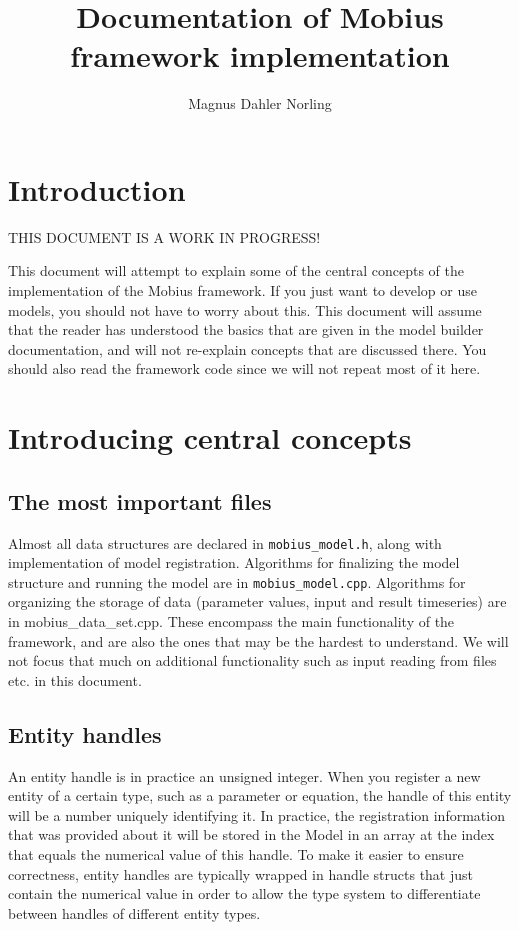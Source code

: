 \documentclass[11pt]{article}
\title{Documentation of Mobius framework implementation}
\author{Magnus Dahler Norling}
\theoremstyle{definition}
\begin{document}
\maketitle

\section{Introduction}
THIS DOCUMENT IS A WORK IN PROGRESS!

This document will attempt to explain some of the central concepts of the implementation of the Mobius framework. If you just want to develop or use models, you should not have to worry about this. This document will assume that the reader has understood the basics that are given in the model builder documentation, and will not re-explain concepts that are discussed there. You should also read the framework code since we will not repeat most of it here.

\section{Introducing central concepts}

\subsection{The most important files}

Almost all data structures are declared in {\tt mobius\_model.h}, along with implementation of model registration. Algorithms for finalizing the model structure and running the model are in {\tt mobius\_model.cpp}. Algorithms for organizing the storage of data (parameter values, input and result timeseries) are in {mobius\_data\_set.cpp}. These encompass the main functionality of the framework, and are also the ones that may be the hardest to understand. We will not focus that much on additional functionality such as input reading from files etc. in this document.

\subsection{Entity handles}

An entity handle is in practice an unsigned integer. When you register a new entity of a certain type, such as a parameter or equation, the handle of this entity will be a number uniquely identifying it. In practice, the registration information that was provided about it will be stored in the Model in an array at the index that equals the numerical value of this handle. To make it easier to ensure correctness, entity handles are typically wrapped in handle structs that just contain the numerical value in order to allow the type system to differentiate between handles of different entity types.
\end{document}
